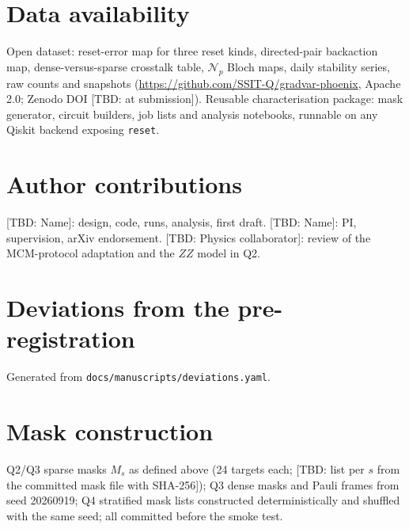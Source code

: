 \documentclass[aps,pra,reprint,superscriptaddress,nofootinbib,longbibliography,amsmath,amssymb]{revtex4-2}
\newcommand{\tbd}[1]{\textcolor{orange!80!black}{[TBD: #1]}}
\newcommand{\Np}{\mathcal{N}_p}
\begin{document}
\section*{Data availability}
Open dataset: reset-error map for three reset kinds, directed-pair backaction map, dense-versus-sparse crosstalk table, $\Np$ Bloch maps, daily stability series, raw counts and snapshots (\url{https://github.com/SSIT-Q/gradvar-phoenix}, Apache 2.0; Zenodo DOI \tbd{at submission}). Reusable characterisation package: mask generator, circuit builders, job lists and analysis notebooks, runnable on any Qiskit backend exposing \texttt{reset}.

\section*{Author contributions}
\tbd{Name}: design, code, runs, analysis, first draft. \tbd{Name}: PI, supervision, arXiv endorsement. \tbd{Physics collaborator}: review of the MCM-protocol adaptation and the $ZZ$ model in Q2.

\appendix
\section{Deviations from the pre-registration}\label{app:deviations}
Generated from \texttt{docs/manuscripts/deviations.yaml}.
\onecolumngrid

\twocolumngrid

\section{Mask construction}\label{app:masks}
Q2/Q3 sparse masks $M_s$ as defined above (24 targets each; \tbd{list per $s$ from the committed mask file with SHA-256}); Q3 dense masks and Pauli frames from seed 20260919; Q4 stratified mask lists constructed deterministically and shuffled with the same seed; all committed before the smoke test.


\end{document}
